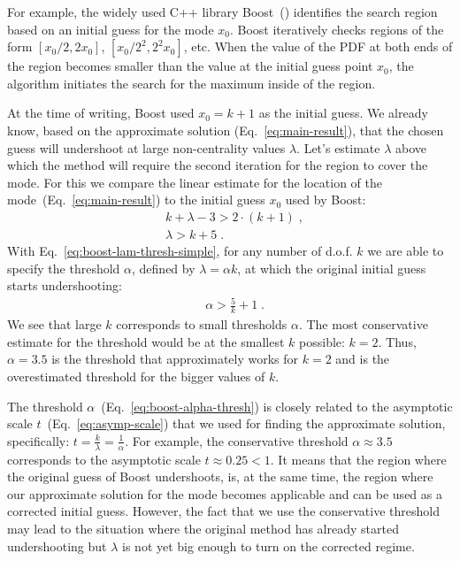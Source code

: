 \documentclass[final,5p,twocolumn,preprint,nopreprintline,times,authoryear]{elsarticle}
\begin{document}
For example, the widely used C++ library Boost~(\cite{boost}) identifies the search region based on an initial guess for the mode $x_0$. Boost iteratively checks regions of the form $[x_0/2, 2x_0]$,  $[x_0/2^2, 2^2x_0]$, etc. When the value of the PDF at both ends of the region becomes smaller than the value at the initial guess point $x_0$, the algorithm initiates the search for the maximum inside of the region.

At the time of writing, Boost used $x_0 = k + 1$ as the initial guess. We already know, based on the approximate solution (Eq.~\ref{eq:main-result}), that the chosen guess will undershoot at large non-centrality values $\lambda$. Let's estimate $\lambda$ above which the method will require the second iteration for the region to cover the mode. For this we compare the linear estimate for the location of the mode~(Eq.~\ref{eq:main-result}) to the initial guess $x_0$ used by Boost:
%
\begin{align}
    &k + \lambda - 3 > 2 \cdot (k + 1)\;, \\
    &\lambda > k + 5 \label{eq:boost-lam-thresh-simple}\;.
\end{align}
%
With Eq.~\ref{eq:boost-lam-thresh-simple}, for any number of d.o.f. $k$ we are able to specify the threshold $\alpha$, defined by $\lambda  = \alpha k$, at which the original initial guess starts undershooting:
%
\begin{align}
    &\alpha > \frac{5}{k} + 1 \label{eq:boost-alpha-thresh}\;.
\end{align}
%
We see that large $k$ corresponds to small thresholds $\alpha$. The most conservative estimate for the threshold would be at the smallest $k$ possible: $k = 2$. Thus, $\alpha = 3.5$ is the threshold that approximately works for $k=2$ and is the overestimated threshold for the bigger values of $k$.

The threshold $\alpha$~(Eq.~\ref{eq:boost-alpha-thresh}) is closely related to the asymptotic scale $t$~(Eq.~\ref{eq:asymp-scale}) that we used for finding the approximate solution, specifically: $t = \frac{k}{\lambda} = \frac{1}{\alpha}$. For example, the conservative threshold $\alpha \approx 3.5$ corresponds to the asymptotic scale $t \approx 0.25 < 1$. It means that the region where the original guess of Boost undershoots, is, at the same time, the region where our approximate solution for the mode becomes applicable and can be used as a corrected initial guess. However, the fact that we use the conservative threshold may lead to the situation where the original method has already started undershooting but $\lambda$ is not yet big enough to turn on the corrected regime.
\end{document}
